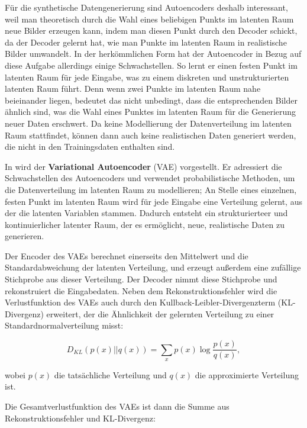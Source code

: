 Für die synthetische Datengenerierung sind Autoencoders deshalb interessant, weil man theoretisch durch die Wahl eines beliebigen Punkts im latenten Raum neue Bilder erzeugen kann, indem man diesen Punkt durch den Decoder schickt, da der Decoder gelernt hat, wie man Punkte im latenten Raum in realistische Bilder umwandelt. \parencite{Foster2020gendeeplearning} In der herkömmlichen Form hat der Autoencoder in Bezug auf diese Aufgabe allerdings einige Schwachstellen. So lernt er einen festen Punkt im latenten Raum für jede Eingabe, was zu einem diskreten und unstrukturierten latenten Raum führt. Denn wenn zwei Punkte im latenten Raum nahe beieinander liegen, bedeutet das nicht unbedingt, dass die entsprechenden Bilder ähnlich sind, was die Wahl eines Punktes im latenten Raum für die Generierung neuer Daten erschwert. Da keine Modellierung der Datenverteilung im latenten Raum stattfindet, können dann auch keine realistischen Daten generiert werden, die nicht in den Trainingsdaten enthalten sind.

In \parencite{Kingma2022vae} wird der \textbf{Variational Autoencoder} (VAE) vorgestellt. Er adressiert die Schwachstellen des Autoencoders und verwendet probabilistische Methoden, um die Datenverteilung im latenten Raum zu modellieren; An Stelle eines einzelnen, festen Punkt im latenten Raum wird für jede Eingabe eine Verteilung gelernt, aus der die latenten Variablen stammen. Dadurch entsteht ein strukturierteer und kontinuierlicher latenter Raum, der es ermöglicht, neue, realistische Daten zu generieren.

Der Encoder des VAEs berechnet einerseits den Mittelwert und die Standardabweichung der latenten Verteilung, und erzeugt außerdem eine zufällige Stichprobe aus dieser Verteilung. Der Decoder nimmt diese Stichprobe und rekonstruiert die Eingabedaten. Neben dem Rekonstruktionsfehler wird die Verlustfunktion des VAEs auch durch den Kullback-Leibler-Divergenzterm (KL-Divergenz) erweitert, der die Ähnlichkeit der gelernten Verteilung zu einer Standardnormalverteilung misst:

\begin{equation}
	D_{KL}(p(x)||q(x)) = \sum_x p(x) \log \frac{p(x)}{q(x)},
	\label{eq:kl-divergence}
\end{equation}

wobei $p(x)$ die tatsächliche Verteilung und $q(x)$ die approximierte Verteilung ist.

Die Gesamtverlustfunktion des VAEs ist dann die Summe aus Rekonstruktionsfehler und KL-Divergenz:

